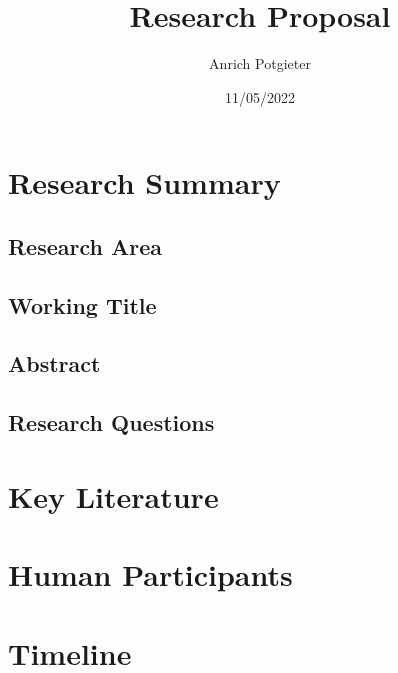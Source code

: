 \documentclass[12pt]{article}
\title{Research Proposal}
\author{Anrich Potgieter}
\date{11/05/2022}
\begin{document}
\maketitle
\tableofcontents

\section{Research Summary}

\subsection{Research Area}

\subsection{Working Title}

\subsection{Abstract}

\subsection{Research Questions}

\section{Key Literature}

\section{Human Participants}

\section{Timeline}
\end{document}
